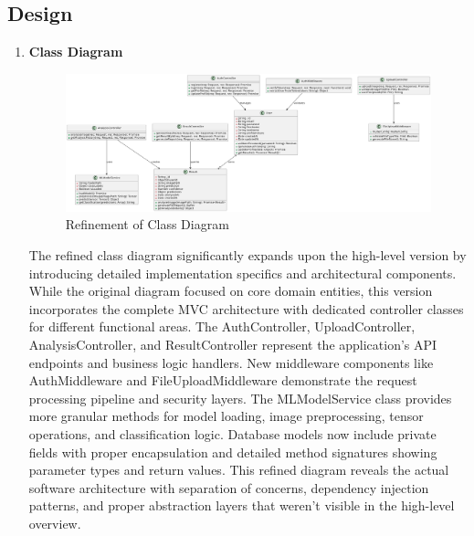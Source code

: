 \section*{\Large{}}
\label{4}
\subsection{Design}
\begin{enumerate}[label=\roman*.]
    \item \textbf{Class Diagram}
          \begin{center}
              \begin{figure}[H]
                  \centering
                  \includegraphics[width=1\linewidth]{Images/Refined/class.pdf}
                  \caption{Refinement of Class Diagram}
                  \label{fig:RefinementofClassDiagram}
              \end{figure}
          \end{center}
          The refined class diagram significantly expands upon the high-level version by introducing detailed implementation specifics and architectural components. While the original diagram focused on core domain entities, this version incorporates the complete MVC architecture with dedicated controller classes for different functional areas. The AuthController, UploadController, AnalysisController, and ResultController represent the application's API endpoints and business logic handlers. New middleware components like AuthMiddleware and FileUploadMiddleware demonstrate the request processing pipeline and security layers. The MLModelService class provides more granular methods for model loading, image preprocessing, tensor operations, and classification logic. Database models now include private fields with proper encapsulation and detailed method signatures showing parameter types and return values. This refined diagram reveals the actual software architecture with separation of concerns, dependency injection patterns, and proper abstraction layers that weren't visible in the high-level overview.

\end{enumerate}
